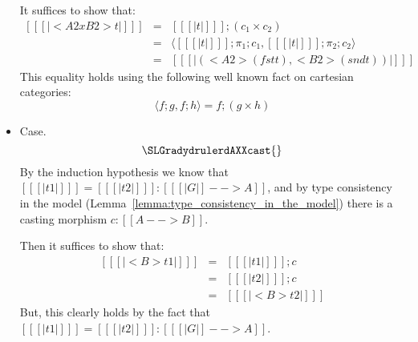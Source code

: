 \begin{itemize}
  It suffices to show that:
  \[
  \begin{array}{lll}
    [[ [| <A2 x B2>t |] ]]
    & = & [[ [| t |] ]];(c_1 \times c_2)\\
    & = & \langle [[ [| t |] ]];\pi_1;c_1 , [[ [| t |] ]];\pi_2;c_2 \rangle\\
    & = & [[ [| (<A2>(fst t),<B2>(snd t)) |] ]]
  \end{array}
  \]
  This equality holds using the following well known fact on
  cartesian categories:
  \[
  \langle f;g,f;h \rangle = f;(g \times h)
  \]

\item[] Case.
  \[
  \SLGradydrulerdAXXcast{} 
  \]
  By the induction hypothesis we know that
  $[[ [| t1 |] ]] = [[ [| t2 |] ]] : [[ [| G |] --> A]]$, and by
  type consistency in the model
  (Lemma~\ref{lemma:type_consistency_in_the_model}) there is a
  casting morphism $c : [[A --> B]]$.

  Then it suffices to show that:
  \[
  \begin{array}{lll}
    [[ [| <B>t1 |] ]]
    & = & [[ [| t1 |] ]];c\\
    & = & [[ [| t2 |] ]];c\\
    & = & [[ [| <B>t2 |] ]]
  \end{array}
  \]
  But, this clearly holds by the fact that $[[ [| t1 |] ]] = [[ [| t2 |] ]] : [[ [| G |] --> A]]$.
\end{itemize}

